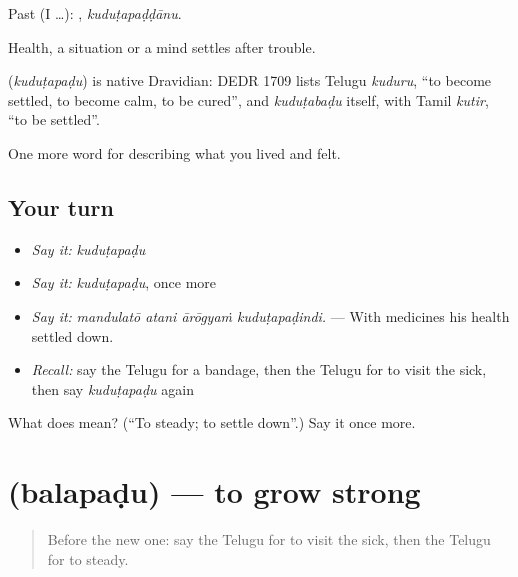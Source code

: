 Past (I …): , \emph{kuduṭapaḍḍānu}.

Health, a situation or a mind settles after trouble.

\begin{cousinweb}
\textbf{} (\emph{kuduṭapaḍu}) is native Dravidian: DEDR 1709 lists Telugu \emph{kuduru}, \textquotedblleft{}to become settled, to become calm, to be cured\textquotedblright{}, and \emph{kuduṭabaḍu} itself, with Tamil \emph{kutir}, \textquotedblleft{}to be settled\textquotedblright{}.
\end{cousinweb}

\begin{grammarlens}[title={What you've built}]
One more word for describing what you lived and felt.
\end{grammarlens}

\subsection*{Your turn}
\begin{itemize}
\raggedright
  \item \emph{Say it:} \emph{kuduṭapaḍu}
  \item \emph{Say it:} \emph{kuduṭapaḍu}, once more
  \item \emph{Say it:} \emph{mandulatō atani ārōgyaṁ kuduṭapaḍindi.} — With medicines his health settled down.
  \item \emph{Recall:} say the Telugu for a bandage, then the Telugu for to visit the sick, then say \emph{kuduṭapaḍu} again
\end{itemize}

\begin{tcolorbox}[breakable,colback=teal!4,colframe=teal!35!black,title={Before you move on}]
What does  mean? (\textquotedblleft{}To steady; to settle down\textquotedblright{}.) Say it once more.
\end{tcolorbox}
\section[\texorpdfstring{\te{బలపడు} (balapaḍu)}{బలపడు (balapaḍu)}]{ (balapaḍu) — to grow strong}

\label{lesson:TE-C520-balapadu}



\begin{quote}
Before the new one: say the Telugu for to visit the sick, then the Telugu for to steady.
\end{quote}


